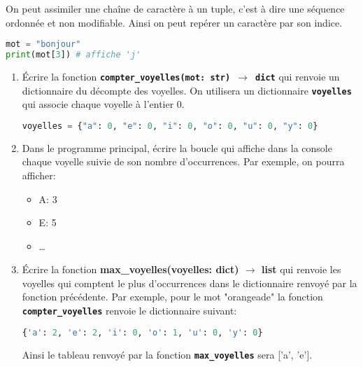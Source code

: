 \documentclass[a4paper,11pt]{article}
\begin{document}
\begin{exo}
    On peut assimiler une chaîne de caractère à un tuple, c'est à dire une séquence ordonnée et non modifiable. Ainsi on peut repérer un caractère par son indice.
    \begin{lstlisting}[language=Python  , xleftmargin=2em, xrightmargin=2em]
mot = "bonjour"
print(mot[3]) # affiche 'j'
\end{lstlisting}
    \begin{enumerate}
        \item Écrire la fonction \texttt{\textbf{compter\_voyelles(mot: str) $\rightarrow$ dict}} qui renvoie un dictionnaire du décompte des voyelles. On utilisera un dictionnaire \texttt{\textbf{voyelles}} qui associe chaque voyelle à l'entier 0.
\begin{lstlisting}[language=Python  , xleftmargin=2em, xrightmargin=2em]
voyelles = {"a": 0, "e": 0, "i": 0, "o": 0, "u": 0, "y": 0}
\end{lstlisting}
        \item Dans le programme principal, écrire la boucle qui affiche dans la console chaque voyelle suivie de son nombre d'occurrences. Par exemple, on pourra afficher:
              \begin{itemize}
                  \item A: 3
                  \item E: 5
                  \item \dots
              \end{itemize}
        \item Écrire la fonction \textbf{max\_voyelles(voyelles: dict) $\rightarrow$ list} qui renvoie les voyelles qui comptent le plus d'occurrences dans le dictionnaire renvoyé par la fonction précédente. Par exemple, pour le mot "orangeade" la fonction \textbf{\texttt{compter\_voyelles}} renvoie le dictionnaire suivant:
\begin{lstlisting}[language=Python  , xleftmargin=2em, xrightmargin=2em]
{'a': 2, 'e': 2, 'i': 0, 'o': 1, 'u': 0, 'y': 0}
\end{lstlisting}
        Ainsi le tableau renvoyé par la fonction \textbf{\texttt{max\_voyelles}} sera ['a', 'e'].
    \end{enumerate}
\end{exo}
\end{document}
